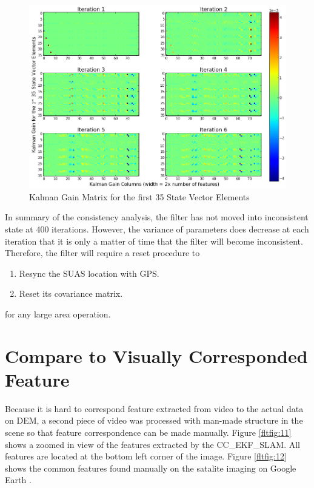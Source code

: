 \begin{figure}[h]
\centering
\includegraphics[width=14cm, keepaspectratio=true]
{./Figures/fltfig/cut1/Figure113.png}
\caption{Kalman Gain Matrix for the first 35 State Vector Elements}
\label{fltfig:5}
\end{figure}

In summary of the consistency analysis, the filter has not moved into
inconsistent state at 400 iterations. However, the variance of
parameters does decrease at each iteration that it is only a matter of
time that the filter will become inconsistent. Therefore, the filter
will require a reset procedure to 

\begin{enumerate}
  \item Resync the SUAS location with GPS. 
  \item Reset its covariance matrix. 
\end{enumerate}

\noindent for any large area operation. 
\FloatBarrier

\section{Compare to Visually Corresponded Feature}
Because it is hard to correspond feature extracted from video to the
actual data on DEM, a second piece of video was processed with
man-made structure in the scene so that feature correspondence can be
made manually. Figure \ref{fltfig:11} shows a zoomed in view of the
features extracted by the CC\_EKF\_SLAM. All features are located at
the bottom left corner of the image. Figure \ref{fltfig:12} shows the
common features found manually on the satalite imaging on Google Earth
\cite{}.

